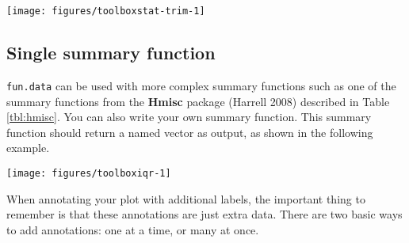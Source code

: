 \begin{flushleft}\texttt{[image: figures/toolboxstat-trim-1]} \end{flushleft}

\subsection{Single summary function}

\texttt{fun.data} can be used with more complex summary functions such
as one of the summary functions from the \textbf{Hmisc} package (Harrell
2008) described in Table \ref{tbl:hmisc}. You can also write your own
summary function. This summary function should return a named vector as
output, as shown in the following example.

\begin{Shaded}
\begin{Highlighting}[]
\NormalTok{>}\StringTok{ }\StringTok{ }
\NormalTok{+}\StringTok{   }\StringTok{ }\NormalTok{(}\NormalTok{(}\NormalTok{, }\NormalTok{), } 
\NormalTok{+}\StringTok{   }\StringTok{ }\NormalTok{(}\NormalTok{, }\NormalTok{)}
\NormalTok{+}\StringTok{   }
\NormalTok{+}\StringTok{ }\NormalTok{\}}
\NormalTok{>}\StringTok{ }\StringTok{ }\NormalTok{(} \NormalTok{, }\NormalTok{)}
\end{Highlighting}
\end{Shaded}

\begin{flushleft}\texttt{[image: figures/toolboxiqr-1]} \end{flushleft}


When annotating your plot with additional labels, the important thing to
remember is that these annotations are just extra data. There are two
basic ways to add annotations: one at a time, or many at once.

